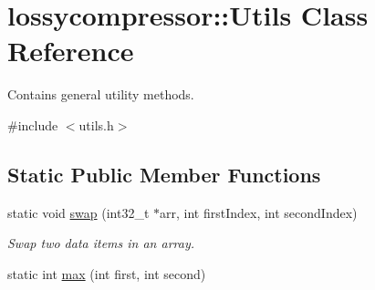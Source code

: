 \hypertarget{classlossycompressor_1_1_utils}{}\section{lossycompressor\+:\+:Utils Class Reference}
\label{classlossycompressor_1_1_utils}


Contains general utility methods.  




{\ttfamily \#include $<$utils.\+h$>$}

\subsection*{Static Public Member Functions}
\begin{DoxyCompactItemize}
\item 
static void \hyperlink{classlossycompressor_1_1_utils_a23beba13407961e8db9a9efac0b8780f}{swap} (int32\+\_\+t $\ast$arr, int first\+Index, int second\+Index)\hypertarget{classlossycompressor_1_1_utils_a23beba13407961e8db9a9efac0b8780f}{}\label{classlossycompressor_1_1_utils_a23beba13407961e8db9a9efac0b8780f}

\begin{DoxyCompactList}\small\item\em Swap two data items in an array. \end{DoxyCompactList}\item 
static int \hyperlink{classlossycompressor_1_1_utils_adf879284f3bd313d718228dba638a81b}{max} (int first, int second)\hypertarget{classlossycompressor_1_1_utils_adf879284f3bd313d718228dba638a81b}{}\label{classlossycompressor_1_1_utils_adf879284f3bd313d718228dba638a81b}


\end{DoxyCompactItemize}
